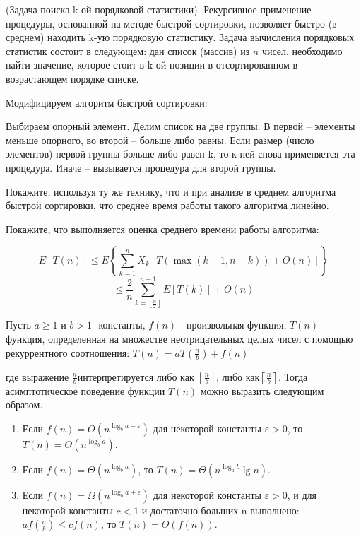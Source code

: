 \begin{problem}

(Задача поиска k-ой порядковой статистики).
Рекурсивное применение процедуры, основанной на методе быстрой сортировки, позволяет быстро (в среднем) находить k-ую порядковую статистику. Задача вычисления порядковых статистик состоит в следующем: дан список (массив) из $n$ чисел, необходимо найти значение, которое стоит в k-ой позиции в отсортированном в возрастающем порядке списке. 

\noindent Модифицируем алгоритм быстрой сортировки:


 Выбираем опорный элемент. Делим список на две группы. В первой -- элементы меньше опорного, во второй -- больше либо равны.
 Если размер (число элементов) первой группы больше либо равен k, то к ней снова применяется эта процедура. Иначе -- вызывается процедура для второй группы.
 
\noindent Покажите, используя ту же технику, что и при анализе в среднем алгоритма быстрой сортировки, что среднее время работы такого алгоритма линейно.

\begin{ordre}

\noindent Покажите, что выполняется оценка среднего времени работы алгоритма:

\[
E[T(n)]\le E\left\{\sum _{k=1}^{n}X_{k} \left[T\left(\max (k-1,n-k)\right)+O(n)\right] \right\} 
\]
\[ \le \frac{2}{n} \sum _{k=\left\lfloor \frac{n}{2} \right\rfloor }^{n-1}E[T(k)] +O(n)
\]



\end{ordre}

\begin{remark}

Пусть $a\ge 1$ и $b>1$- константы, $f(n)$ - произвольная функция, $T(n)$ - функция, определенная на множестве неотрицательных целых чисел с помощью рекуррентного соотношения: $T(n)=aT\left(\frac{n}{b} \right)+f(n)$

\noindent где выражение $\frac{n}{b} $интерпретируется либо как $\left\lfloor \frac{n}{b} \right\rfloor $, либо как$\left\lceil \frac{n}{b} \right\rceil $. Тогда асимптотическое поведение функции $T(n)$ можно выразить следующим образом. 

\begin{enumerate}
\item  Если $f(n)=O(n^{\log _{b} a-\varepsilon } )$ для некоторой константы $\varepsilon >0$, то $T(n)=\Theta \left(n^{\log _{b} a} \right)$.

\item  Если $f(n)=\Theta \left(n^{\log _{b} a} \right)$, то $T(n)=\Theta \left(n^{\log _{a} b} \lg n\right)$.

\item  Если $f(n)=\Omega (n^{\log _{b} a+\varepsilon } )$ для некоторой константы $\varepsilon >0$, и для некоторой константы $c<1$ и достаточно больших n выполнено: $af\left(\frac{n}{b} \right)\le cf(n)$, то $T(n)=\Theta \left(f(n)\right)$.
\end{enumerate}

\end{remark}
\end{problem}



